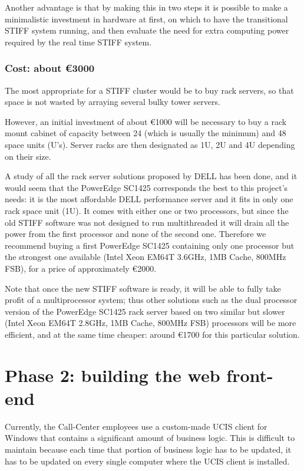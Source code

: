 Another advantage is that by making this in two steps it is possible to
make a minimalistic investment in hardware at first, on which to have the
transitional STIFF system running, and then evaluate the need for extra
computing power required by the real time STIFF system.

\subsubsection*{Cost: about \euro3000}

The most appropriate for a STIFF cluster would be to buy rack servers, so
that space is not wasted by arraying several bulky tower servers.

However, an initial investment of about \euro1000 will be
necessary to buy a rack mount cabinet of capacity between 24 (which is
usually the minimum) and 48 space units (U's). Server racks are then
designated as 1U, 2U and 4U depending on their size.

A study of all the rack server solutions proposed by DELL
has been done, and it would seem that the PowerEdge SC1425 corresponds
the best to this project's needs: it is the most affordable DELL
performance server and it fits in only one rack space unit (1U). It comes
with either one or two processors, but since the old STIFF software was not
designed to run multithreaded it will drain all the power from the first
processor and none of the second one. Therefore we recommend buying a first
PowerEdge SC1425 containing only one processor but the strongest one available
(Intel Xeon EM64T 3.6GHz, 1MB Cache, 800MHz FSB), for a price of
approximately \euro2000.

Note that once the new STIFF software is ready, it will be able to fully
take profit of a multiprocessor system; thus other solutions such as the dual
processor version of the PowerEdge SC1425 rack server based on two similar
but slower (Intel Xeon EM64T 2.8GHz, 1MB Cache, 800MHz FSB) processors will
be more efficient, and at the same time cheaper: around \euro1700 for this
particular solution.

\section{Phase 2: building the web front-end}

Currently, the Call-Center employees use a custom-made UCIS client
for Windows that contains a significant amount of business logic.
This is difficult to maintain because each time that portion of
business logic has to be updated, it has to be updated on every single
computer where the UCIS client is installed.


